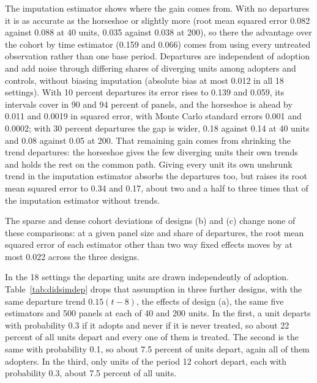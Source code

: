The imputation estimator shows where the gain comes from. With no departures it is as accurate as the horseshoe or slightly more (root mean squared error 0.082 against 0.088 at 40 units, 0.035 against 0.038 at 200), so there the advantage over the cohort by time estimator (0.159 and 0.066) comes from using every untreated observation rather than one base period. Departures are independent of adoption and add noise through differing shares of diverging units among adopters and controls, without biasing imputation (absolute bias at most 0.012 in all 18 settings). With 10 percent departures its error rises to 0.139 and 0.059, its intervals cover in 90 and 94 percent of panels, and the horseshoe is ahead by 0.011 and 0.0019 in squared error, with Monte Carlo standard errors 0.001 and 0.0002; with 30 percent departures the gap is wider, 0.18 against 0.14 at 40 units and 0.08 against 0.05 at 200. That remaining gain comes from shrinking the trend departures: the horseshoe gives the few diverging units their own trends and holds the rest on the common path. Giving every unit its own unshrunk trend in the imputation estimator absorbs the departures too, but raises its root mean squared error to 0.34 and 0.17, about two and a half to three times that of the imputation estimator without trends.

The sparse and dense cohort deviations of designs (b) and (c) change none of these comparisons: at a given panel size and share of departures, the root mean squared error of each estimator other than two way fixed effects moves by at most 0.022 across the three designs.

In the 18 settings the departing units are drawn independently of adoption. Table~\ref{tab:didsimdep} drops that assumption in three further designs, with the same departure trend $0.15(t-8)$, the effects of design (a), the same five estimators and 500 panels at each of 40 and 200 units. In the first, a unit departs with probability 0.3 if it adopts and never if it is never treated, so about 22 percent of all units depart and every one of them is treated. The second is the same with probability 0.1, so about 7.5 percent of units depart, again all of them adopters. In the third, only units of the period 12 cohort depart, each with probability 0.3, about 7.5 percent of all units.

